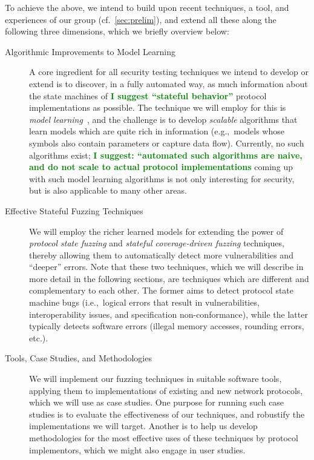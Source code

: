 \documentclass[11pt]{article}
\newcommand{\bjcom}[1]{\textcolor{green}{\textbf{#1}}}
\newcommand{\eg}{e.\/g.,\ }
\newcommand{\ie}{i.\/e.,\ }
\begin{document}
To achieve the above, we intend to build upon recent techniques, a tool, and
experiences of our group (cf.\ \cref{sec:prelim}), and extend all these along
the following three dimensions, which we briefly overview below:
\begin{description}
\item[Algorithmic Improvements to Model Learning] A core ingredient for all
  security testing techniques we intend to develop or extend is to discover,
  in a fully automated way, as much information about the state machines of
\bjcom{I suggest ``stateful behavior''}
  protocol implementations as possible. The technique we will employ for this
  is \emph{model learning}~\cite{Angluin1987,Vaandrager@CACM-17}, and the
  challenge is to develop \emph{scalable} algorithms that learn models which
  are quite rich in information (\eg models whose symbols also contain
  parameters or capture data flow). Currently, no such algorithms exist;
\bjcom{I suggest: ``automated such algorithms are naive, and do not scale to actual protocol implementations}
  coming up with such model learning algorithms is not only interesting for
  security, but is also applicable to many other areas.
\item[Effective Stateful Fuzzing Techniques] We will employ the richer
  learned models for extending the power of \emph{protocol state fuzzing} and
  \emph{stateful coverage-driven fuzzing} techniques, thereby allowing them
  to automatically detect more vulnerabilities and ``deeper'' errors. Note that
  these two techniques, which we will describe in more detail in the following
  sections, are techniques which are different and complementary to each
  other. The former aims to detect protocol state machine bugs (\ie logical
  errors that result in vulnerabilities, interoperability issues, and
  specification non-conformance), while the latter typically detects software
  errors (illegal memory accesses, rounding errors, etc.).
\item[Tools, Case Studies, and Methodologies] We will implement our fuzzing
  techniques in suitable software tools, applying them to implementations of
  existing and new network protocols, which we will use as case studies. One
  purpose for running such case studies is to evaluate the effectiveness of
  our techniques, and robustify the implementations we will target. Another is
  to help us develop methodologies for the most effective uses of these
  techniques by protocol implementors, which we might also engage in user
  studies.
\end{description}
\end{document}
